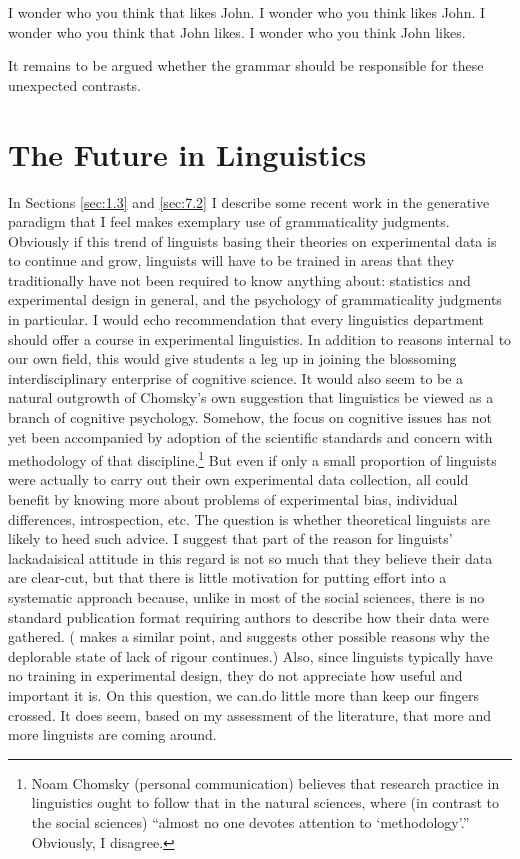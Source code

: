  \ea\label{ex:6:3}
 \ea I wonder who you think that likes John.
 \ex I wonder who you think likes John.
 \ex I wonder who you think that John likes. 
 \ex I wonder who you think John likes.
 \z
 \z
 
 \noindent
 It remains to be argued whether the grammar should be responsible for these unexpected contrasts.

 \section{The Future in Linguistics}\label{sec:7.3}

 In Sections \ref{sec:1.3} and \ref{sec:7.2}
 I describe some recent work in the generative paradigm that I feel makes exemplary use of grammaticality judgments. Obviously if this trend of linguists basing their theories on experimental data is to continue and grow, linguists will have to be trained in areas that they traditionally have not been required to know anything about: statistics and experimental design in general, and the psychology of grammaticality judgments in particular. I would echo  recommendation that every linguistics department should offer a course in experimental linguistics. In addition to reasons internal to our own field, this would give students a leg up in joining the blossoming interdisciplinary enterprise of cognitive science. It would also seem to be a natural outgrowth of Chomsky's own suggestion that linguistics be viewed as a branch of cognitive psychology. Somehow, the focus on cognitive issues has not yet been accompanied by adoption of the scientific standards and concern with methodology of that discipline.\footnote{Noam Chomsky (personal communication) believes that research practice in linguistics ought to follow that in the natural sciences, where (in contrast to the social sciences) ``almost no one devotes attention to `methodology'.'' Obviously, I disagree.}
  But even if only a small proportion of linguists were
 actually to carry out their own experimental data collection, all could benefit by knowing more about problems of experimental bias, individual differences, introspection, etc. The question is whether theoretical linguists are likely to heed such advice. I suggest that part of the reason for linguists' lackadaisical attitude in this regard is not so much that they believe their data are clear-cut, but that there is little motivation for putting effort into a systematic approach because, unlike in most of the social sciences, there is no standard publication format requiring authors to describe how their data were gathered. (\citet{Grandy1981} makes a similar point, and suggests other possible reasons why the deplorable state of lack of rigour continues.) Also, since linguists typically have no training in experimental design, they do not appreciate how useful and important it is. On this question, we can.do little more than keep our fingers crossed. It does seem, based on my assessment of the literature, that more and more linguists are coming around.

